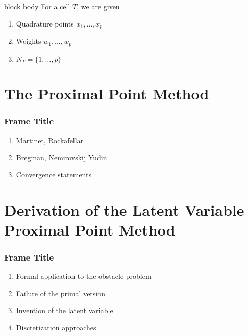 \documentclass[aspectratio=169,xcolor=dvipsnames,11pt]{beamer}
\begin{document}
\begin{frame}
\begin{minipage}{0.68\textwidth}
\begin{beamercolorbox}[rounded=true, shadow=true, wd=\textwidth]{block body}
For a cell $T$, we are given
\begin{enumerate}
\item Quadrature points $x_1,\dots,x_p$
\item Weights $w_1,\dots,w_p$
\item $N_{T} = \{1,\dots,p\}$ 
\end{enumerate}
 \end{beamercolorbox}
\end{minipage}
\end{frame}

\section{The Proximal Point Method}
 \begin{frame}\frametitle{Frame Title}
    \begin{enumerate}
    	\item Martinet, Rockafellar
	\item Bregman, Nemirovskij Yudin
	\item Convergence statements
    \end{enumerate}
 \end{frame}

\section{Derivation of the Latent Variable Proximal Point Method}
 \begin{frame}\frametitle{Frame Title}
        \begin{enumerate}
    	\item Formal application to the obstacle problem
	\item Failure of the primal version
	\item Invention of the latent variable
	\item Discretization approaches
    \end{enumerate}
 \end{frame}
 
\end{document}
